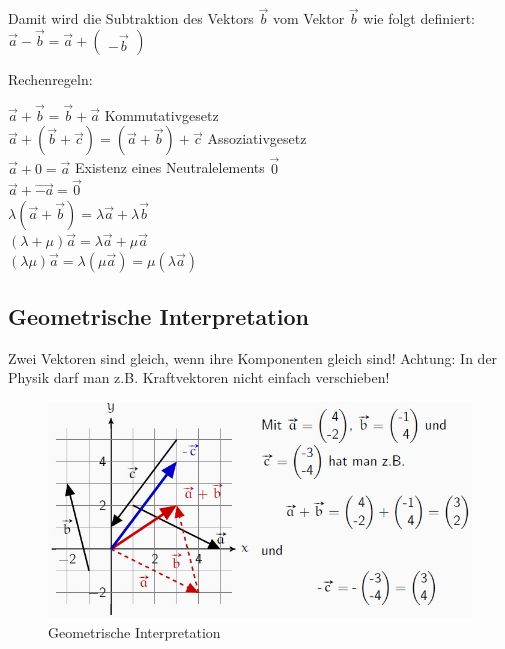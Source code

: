Damit wird die Subtraktion des Vektors $\vec{b}$ vom Vektor $\vec{b}$ wie folgt definiert:
\begin{math}
	\vec{a} -\vec{b} = \vec{a} + \begin{pmatrix} -\vec{b} \end{pmatrix}
\end{math}

\begin{description}
	\item[Rechenregeln:]
\end{description}
\begin{math}
	\vec{a} + \vec{b} = \vec{b} + \vec{a}
\end{math}
Kommutativgesetz\\
\begin{math}
	\vec{a} + (\vec{b} + \vec{c}) = (\vec{a} + \vec{b}) + \vec{c}
\end{math}
Assoziativgesetz\\
\begin{math}
	\vec{a} + 0 = \vec{a}
\end{math}
Existenz eines Neutralelements $\vec{0}$\\
$\vec{a} + \vec{-a} = \vec{0}$\\
$\lambda (\vec{a} + \vec{b}) = \lambda \vec{a} + \lambda \vec{b}$\\
$(\lambda + \mu) \vec{a} = \lambda \vec{a} + \mu \vec{a}$\\
$(\lambda \mu) \vec{a} = \lambda (\mu \vec{a}) = \mu (\lambda \vec{a})$
\newpage

\subsection{Geometrische Interpretation}

Zwei Vektoren sind gleich, wenn ihre Komponenten gleich sind!
Achtung: In der Physik darf man z.B. Kraftvektoren nicht einfach
verschieben!

\begin{figure}[!ht]
	\centering
	\includegraphics[width=0.7\linewidth]{fig/geometrische_interpretation}
	\caption{Geometrische Interpretation}
	\label{fig:geometrische_interpretation}
\end{figure}

